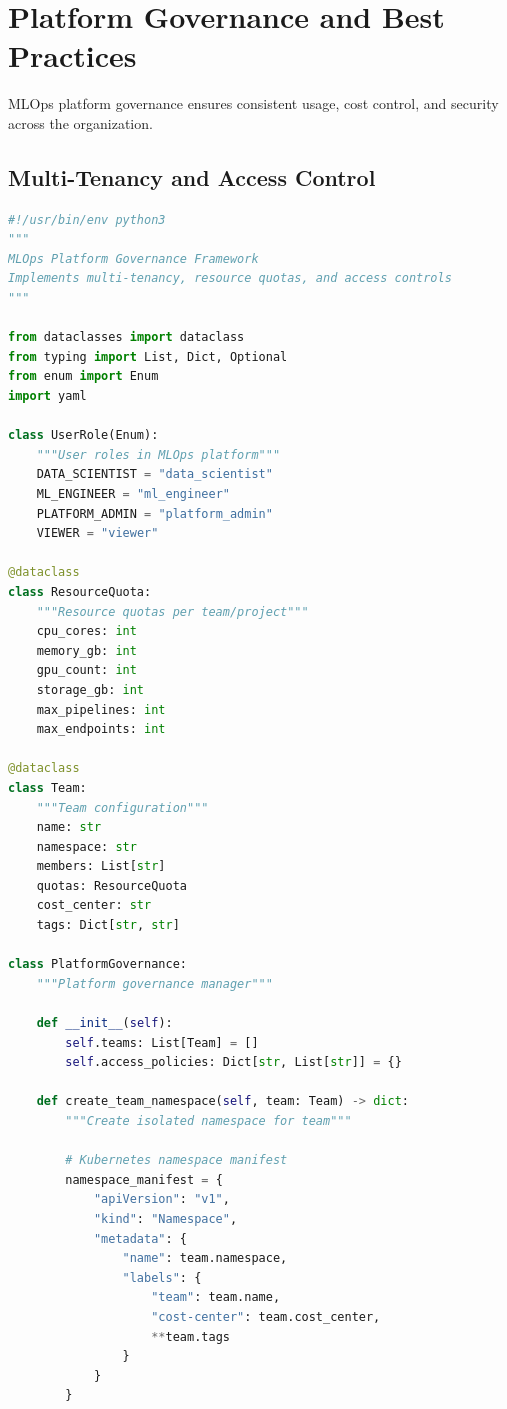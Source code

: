 \section{Platform Governance and Best Practices}

MLOps platform governance ensures consistent usage, cost control, and security across the organization.

\subsection{Multi-Tenancy and Access Control}

\begin{lstlisting}[language=Python, caption=Platform Governance Framework]
#!/usr/bin/env python3
"""
MLOps Platform Governance Framework
Implements multi-tenancy, resource quotas, and access controls
"""

from dataclasses import dataclass
from typing import List, Dict, Optional
from enum import Enum
import yaml

class UserRole(Enum):
    """User roles in MLOps platform"""
    DATA_SCIENTIST = "data_scientist"
    ML_ENGINEER = "ml_engineer"
    PLATFORM_ADMIN = "platform_admin"
    VIEWER = "viewer"

@dataclass
class ResourceQuota:
    """Resource quotas per team/project"""
    cpu_cores: int
    memory_gb: int
    gpu_count: int
    storage_gb: int
    max_pipelines: int
    max_endpoints: int

@dataclass
class Team:
    """Team configuration"""
    name: str
    namespace: str
    members: List[str]
    quotas: ResourceQuota
    cost_center: str
    tags: Dict[str, str]

class PlatformGovernance:
    """Platform governance manager"""

    def __init__(self):
        self.teams: List[Team] = []
        self.access_policies: Dict[str, List[str]] = {}

    def create_team_namespace(self, team: Team) -> dict:
        """Create isolated namespace for team"""

        # Kubernetes namespace manifest
        namespace_manifest = {
            "apiVersion": "v1",
            "kind": "Namespace",
            "metadata": {
                "name": team.namespace,
                "labels": {
                    "team": team.name,
                    "cost-center": team.cost_center,
                    **team.tags
                }
            }
        }


\end{lstlisting}
